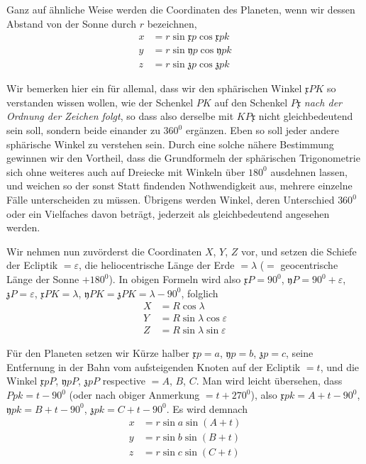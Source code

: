 Ganz auf ähnliche Weise werden die Coordinaten des Planeten, wenn wir
dessen Abstand von der Sonne durch $r$ bezeichnen,
\[
\begin{aligned}
x&=r\sin\mathfrak{x}p\cos\mathfrak{x}pk\\
y&=r\sin\mathfrak{y}p\cos\mathfrak{y}pk\\
z&=r\sin\mathfrak{z}p\cos\mathfrak{z}pk
\end{aligned}
\]

Wir bemerken hier ein für allemal, dass wir den sphärischen Winkel
$\mathfrak{x}PK$ so verstanden wissen wollen, wie der Schenkel $PK$ auf den Schenkel
$P\mathfrak{x}$ \textit{nach der Ordnung der Zeichen folgt}, so dass also derselbe mit $KP\mathfrak{x}$ nicht
gleichbedeutend sein soll, sondern beide einander zu $360^0$ ergänzen. Eben so
soll jeder andere sphärische Winkel zu verstehen sein. Durch eine solche nähere
Bestimmung gewinnen wir den Vortheil, dass die Grundformeln der sphärischen
Trigonometrie sich ohne weiteres auch auf Dreiecke mit Winkeln über
$180^0$ ausdehnen lassen, und weichen so der sonst Statt findenden Nothwendigkeit
aus, mehrere einzelne Fälle unterscheiden zu müssen. Übrigens werden
Winkel, deren Unterschied $360^0$ oder ein Vielfaches davon beträgt, jederzeit
als gleichbedeutend angesehen werden.

Wir nehmen nun zuvörderst die Coordinaten $X$, $Y$, $Z$ vor, und setzen die
Schiefe der Ecliptik $=\varepsilon$, die heliocentrische Länge der Erde $=\lambda$ ($=$ geocentrische
Länge der Sonne $+180^0$). In obigen Formeln wird also $\mathfrak{x}P=90^0$,
$\mathfrak{y}P=90^0+\varepsilon$, $\mathfrak{z}P=\varepsilon$, $\mathfrak{x}PK=\lambda$, $\mathfrak{y}PK=\mathfrak{z}PK=\lambda-90^0$, folglich
%
\[
\begin{aligned}
X&=R\cos\lambda\\
Y&=R\sin\lambda\cos\varepsilon\\
Z&=R\sin\lambda\sin\varepsilon
\end{aligned}
\]

Für den Planeten setzen wir Kürze halber $\mathfrak{x}p=a$, $\mathfrak{y}p=b$, $\mathfrak{z}p=c$, seine
Entfernung in der Bahn vom aufsteigenden Knoten auf der Ecliptik $=t$, und
die Winkel $\mathfrak{x}pP$, $\mathfrak{y}pP$, $\mathfrak{z}pP$ respective $=A$, $B$, $C$. Man wird leicht übersehen,
dass $Ppk=t-90^0$ (oder nach obiger Anmerkung $=t+270^0$), also
$\mathfrak{x}pk=A+t-90^0$, $\mathfrak{y}pk=B+t-90^0$, $\mathfrak{z}pk=C+t-90^0$. Es wird demnach
\[
\begin{aligned}
x&=r\sin a\sin(A+t)\\
y&=r\sin b\sin(B+t)\\
z&=r\sin c\sin(C+t)
\end{aligned}
\]

